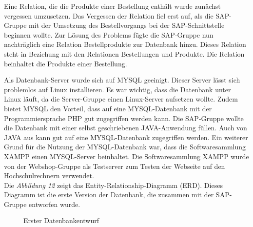 Eine Relation, die die Produkte einer Bestellung enthält wurde zunächst vergessen umzusetzen. Das Vergessen der Relation fiel erst auf, als die SAP-Gruppe mit der Umsetzung des Bestellvorgangs bei der SAP-Schnittstelle beginnen wollte. Zur Lösung des Problems fügte die SAP-Gruppe nun nachträglich eine Relation \glqq Bestellprodukte\grqq{} zur Datenbank hinzu. Dieses Relation steht in Beziehung mit den Relationen \glqq Bestellungen\grqq{} und \glqq Produkte\grqq{}. Die Relation beinhaltet die Produkte einer Bestellung.

Als Datenbank-Server wurde sich auf MYSQL geeinigt. Dieser Server lässt sich problemlos auf Linux installieren. Es war wichtig, dass die Datenbank unter Linux läuft, da die Server-Gruppe einen Linux-Server aufsetzen wollte. Zudem bietet MYSQL den Vorteil, dass auf eine MYSQL-Datenbank mit der Programmiersprache PHP gut zugegriffen werden kann. Die SAP-Gruppe wollte die Datenbank mit einer selbst geschriebenen JAVA-Anwendung füllen. Auch von JAVA aus kann gut auf eine MYSQL-Datenbank zugegriffen werden. Ein weiterer Grund für die Nutzung der MYSQL-Datenbank war, dass die Softwaresammlung XAMPP einen MYSQL-Server beinhaltet. Die Softwaresammlung XAMPP wurde von der Webshop-Gruppe als Testserver zum Testen der Webseite auf den Hochschulrechnern verwendet. \\
Die \textit{Abbildung 12} zeigt das \glqq Entity-Relationship-Diagramm (ERD)\grqq{}. Dieses Diagramm ist die erste Version der Datenbank, die zusammen mit der SAP-Gruppe entworfen wurde. 

\begin{figure}[H]
	\begin{center}
	\end{center}
	\caption{Erster Datenbankentwurf}
\end{figure}

